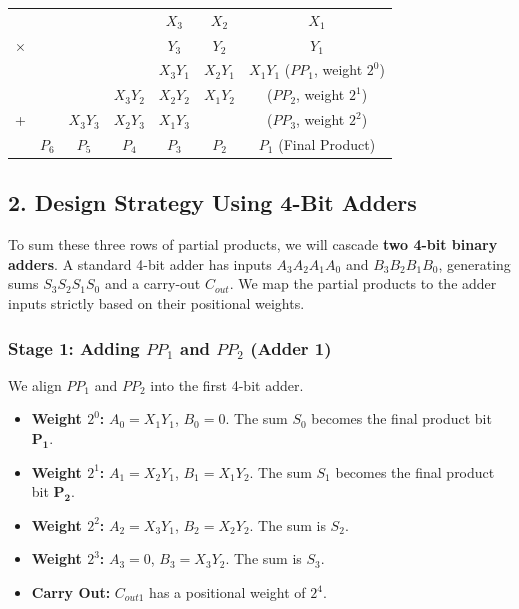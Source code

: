 \documentclass[12pt,a3paper]{article}
\begin{document}
\begin{enumerate}
\begin{tcolorbox}[enhanced,breakable,ansbox,colback=cD!4,colframe=cD,boxrule=0.8pt,arc=5pt,title={\textbf{Answer}},fonttitle=\bfseries\color{white},colbacktitle=cD]
\begin{center}
\renewcommand{\arraystretch}{1.2}
\begin{tabular}{ccccccc}
  &   &   &   & $X_3$ & $X_2$ & $X_1$ \\
$\times$ &   &   &   & $Y_3$ & $Y_2$ & $Y_1$ \\
\toprule
  &   &   &   & $X_3 Y_1$ & $X_2 Y_1$ & $X_1 Y_1$ \quad \textcolor{cD}{($PP_1$, weight $2^0$)} \\
  &   &   & $X_3 Y_2$ & $X_2 Y_2$ & $X_1 Y_2$ & \quad \quad \quad \textcolor{cD}{($PP_2$, weight $2^1$)} \\
+ &   & $X_3 Y_3$ & $X_2 Y_3$ & $X_1 Y_3$ &   & \quad \quad \quad \textcolor{cD}{($PP_3$, weight $2^2$)} \\
\midrule
  & $P_6$ & $P_5$ & $P_4$ & $P_3$ & $P_2$ & $P_1$ \quad \textcolor{cD}{(Final Product)} \\
\bottomrule
\end{tabular}
\end{center}

\subsection*{2. Design Strategy Using 4-Bit Adders}

To sum these three rows of partial products, we will cascade \textbf{two 4-bit binary adders}. A standard 4-bit adder has inputs $A_3 A_2 A_1 A_0$ and $B_3 B_2 B_1 B_0$, generating sums $S_3 S_2 S_1 S_0$ and a carry-out $C_{out}$. We map the partial products to the adder inputs strictly based on their positional weights.

\subsubsection*{Stage 1: Adding $PP_1$ and $PP_2$ (Adder 1)}
We align $PP_1$ and $PP_2$ into the first 4-bit adder.
\begin{itemize}
    \item \textbf{Weight $2^0$:} $A_0 = X_1 Y_1$, $B_0 = 0$. The sum $S_0$ becomes the final product bit \textcolor{cD}{$\mathbf{P_1}$}.
    \item \textbf{Weight $2^1$:} $A_1 = X_2 Y_1$, $B_1 = X_1 Y_2$. The sum $S_1$ becomes the final product bit \textcolor{cD}{$\mathbf{P_2}$}.
    \item \textbf{Weight $2^2$:} $A_2 = X_3 Y_1$, $B_2 = X_2 Y_2$. The sum is $S_2$.
    \item \textbf{Weight $2^3$:} $A_3 = 0$, $B_3 = X_3 Y_2$. The sum is $S_3$.
    \item \textbf{Carry Out:} $C_{out1}$ has a positional weight of $2^4$.
\end{itemize}


\end{tcolorbox}
\end{enumerate}
\end{document}
